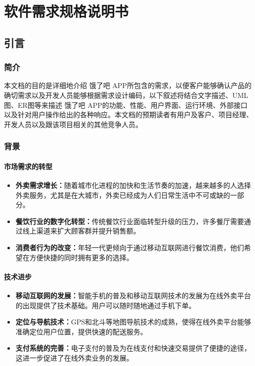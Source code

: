 \chapter{软件需求规格说明书}

\section{引言}

\subsection{简介}

本文档的目的是详细地介绍 饿了吧 APP所包含的需求，以便客户能够确认产品的确切需求以及开发人员能够根据需求设计编码，以下叙述将结合文字描述、UML图、ER图等来描述 饿了吧 APP的功能、性能、用户界面、运行环境、外部接口以及针对用户操作给出的各种响应。本文档的预期读者有用户及客户、项目经理、开发人员以及跟该项目相关的其他竞争人员。

\subsection{背景}

\subsubsection{市场需求的转型}

 \begin{itemize}
     \item \textbf{外卖需求增长：}随着城市化进程的加快和生活节奏的加速，越来越多的人选择外卖服务，尤其是在大城市，外卖已经成为人们日常生活中不可或缺的一部分。
     \item \textbf{餐饮行业的数字化转型：}传统餐饮行业面临转型升级的压力，许多餐厅需要通过线上渠道来扩大顾客群并提升销售额。
     \item \textbf{ 消费者行为的改变：}年轻一代更倾向于通过移动互联网进行餐饮消费，他们希望在方便快捷的同时拥有更多的选择。
 \end{itemize}

\subsubsection{ 技术进步}

 \begin{itemize}
     \item \textbf{移动互联网的发展：}智能手机的普及和移动互联网技术的发展为在线外卖平台的出现提供了技术基础。用户可以随时随地通过手机下单。
     \item \textbf{定位与导航技术：}GPS和北斗等地图导航技术的成熟，使得在线外卖平台能够准确定位用户位置，提供快速的配送服务。
     \item \textbf{支付系统的完善：}电子支付的普及为在线支付和快速交易提供了便捷的途径，这进一步促进了在线外卖业务的发展。
 \end{itemize}

